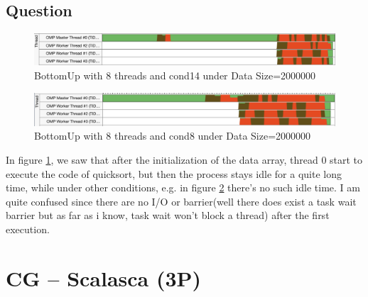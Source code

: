 \documentclass[article]{scrartcl}
\begin{document}
\subsection{Question}
\begin{figure}[htpb]
    \centering
    \includegraphics[width=\textwidth,keepaspectratio=true]{../figs/bottomup1.png}
    \caption{BottomUp with 8 threads and cond14 under Data Size=2000000}
    \label{fig:quickQes}
\end{figure}
\begin{figure}[htpb]
    \centering
    \includegraphics[width=\textwidth,keepaspectratio=true]{../figs/bottomup2.png}
    \caption{BottomUp with 8 threads and cond8 under Data Size=2000000}
    \label{fig:quickQes2}
\end{figure}
In figure \ref{fig:quickQes}, we saw that after the initialization of the data array, thread 0 start to execute the code of quicksort, but then the process stays idle for a quite long time,
while under other conditions, e.g. in figure \ref{fig:quickQes2} there's no such idle time. I am quite confused since there are no I/O or barrier(well there does exist a task wait barrier but as far as i know, task wait won't block a thread) after the first execution.

\section{CG – Scalasca (3P)}
\end{document}
